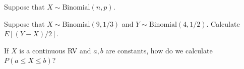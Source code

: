 \documentclass[addpoints,12pt]{exam}
\begin{document}
\begin{questions}
\question Suppose that $X \sim \text{Binomial}(n,p)$. 

\question Suppose that $X \sim \text{Binomial}(9, 1/3)$ and $Y \sim \text{Binomial}(4, 1/2)$. Calculate $E[(Y - X) / 2]$. 



%

\question If $X$ is a continuous RV and $a,b$ are constants, how do we calculate $P(a \leq X \leq b)$?


\end{questions}
\end{document}
